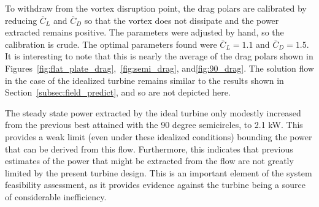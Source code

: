 To withdraw from the vortex disruption point, the drag
polars are calibrated by reducing $\bar C_L $ and $\bar C_D$ so that the 
vortex does not dissipate and the power extracted remains positive. The
parameters were adjusted by hand, so the calibration is crude. The
optimal parameters found were $\bar C_L = 1.1$ and $\bar C_D = 1.5$. It
is interesting to note that this is nearly the average of the drag
polars shown in Figures~\ref{fig:flat_plate_drag},~\ref{fig:semi_drag}, 
and\ref{fig:90_drag}. The solution flow in the case of the idealized
turbine remains similar to the results shown in
Section~\ref{subsec:field_predict}, and so are not depicted here. 

The steady state power extracted by the ideal turbine only modestly
increased from the previous best attained with the 90 degree
semicircles, to 2.1 kW. This provides a weak limit 
(even under these idealized conditions) bounding the power that can be
derived from this flow. Furthermore, this indicates that previous
estimates of the power that might be extracted from the flow are not
greatly limited by the present turbine design. This is an important
element of the system feasibility assessment, as it provides evidence
against the turbine being a source of considerable inefficiency. 


